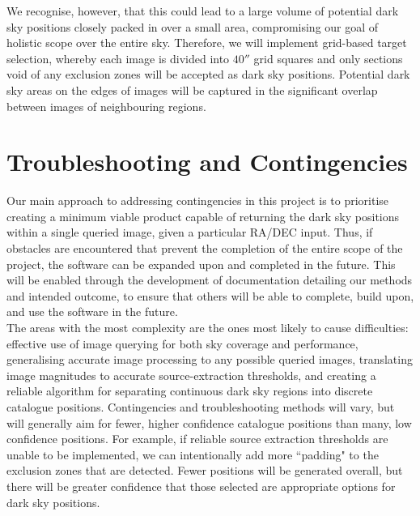 \documentclass[11pt]{article}
\begin{document}
We recognise, however, that this could lead to a large volume of potential dark sky positions closely packed in over a small area, compromising our goal of holistic scope over the entire sky. Therefore, we will implement grid-based target selection, whereby each image is divided into $40''$ grid squares and only sections void of any exclusion zones will be accepted as dark sky positions. Potential dark sky areas on the edges of images will be captured in the significant overlap between images of neighbouring regions.

\section{Troubleshooting and Contingencies}
Our main approach to addressing contingencies in this project is to prioritise creating a minimum viable product capable of returning the dark sky positions within a single queried image, given a particular RA/DEC input. Thus, if obstacles are encountered that prevent the completion of the entire scope of the project, the software can be expanded upon and completed in the future. This will be enabled through the development of documentation detailing our methods and intended outcome, to ensure that others will be able to complete, build upon, and use the software in the future. \\

The areas with the most complexity are the ones most likely to cause difficulties: effective use of image querying for both sky coverage and performance, generalising accurate image processing to any possible queried images, translating image magnitudes to accurate source-extraction thresholds, and creating a reliable algorithm for separating continuous dark sky regions into discrete catalogue positions. Contingencies and troubleshooting methods will vary, but will generally aim for fewer, higher confidence catalogue positions than many, low confidence positions. For example, if reliable source extraction thresholds are unable to be implemented, we can intentionally add more ``padding" to the exclusion zones that are detected. Fewer positions will be generated overall, but there will be greater confidence that those selected are appropriate options for dark sky positions. 
\end{document}
